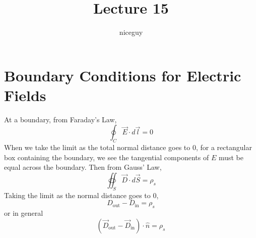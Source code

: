 \documentclass[12pt]{article}
\author{niceguy}
\title{Lecture 15}
\begin{document}
\maketitle

\section{Boundary Conditions for Electric Fields}

At a boundary, from Faraday's Law,
$$\oint_C \vec{E} \cdot d\vec{l} = 0$$
When we take the limit as the total normal distance goes to 0, for a rectangular box containing the boundary, we see the tangential components of $E$ must be equal across the boundary. Then from Gauss' Law,
$$\oiint_S \vec{D}\cdot d\vec{S} = \rho_s$$
Taking the limit as the normal distance goes to 0,
$$D_{\text{out}} - D_{\text{in}} = \rho_s$$
or in general
$$(\vec{D}_{\text{out}} - \vec{D}_{\text{in}})\cdot\hat{n} = \rho_s$$
\end{document}

